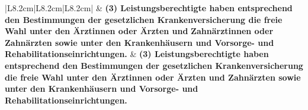 \documentclass[10pt,a4paper,landscape]{article}
\begin{document}
\begin{longtable}{|L{8.2cm}|L{8.2cm}|L{8.2cm}|}
 & \textbf{(3) Leistungsberechtigte haben  \newline entsprechend den Bestimmungen der  \newline gesetzlichen Krankenversicherung die  \newline freie Wahl unter den Ärztinnen oder  \newline Ärzten und }\textbf{\textcolor{diffred}{Zahnärztinnen oder}}\textbf{  \newline Zahnärzten sowie unter den  \newline Krankenhäusern und Vorsorge- und  \newline Rehabilitationseinrichtungen. } & \textbf{(3) Leistungsberechtigte haben  \newline entsprechend den Bestimmungen der  \newline gesetzlichen Krankenversicherung die  \newline freie Wahl unter den Ärztinnen oder  \newline Ärzten und Zahnärzten sowie unter den  \newline Krankenhäusern und Vorsorge- und  \newline Rehabilitationseinrichtungen. } \\
\hhline{|---|}

\end{longtable}
\end{document}
